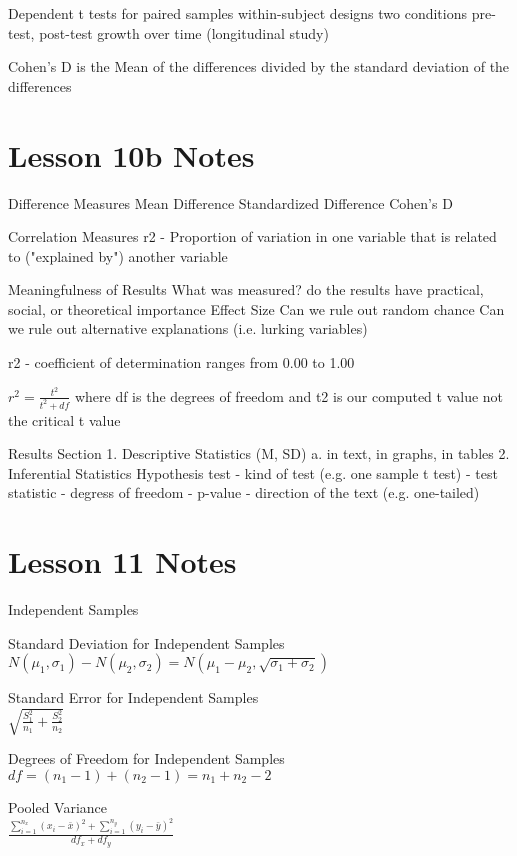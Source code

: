 \documentclass{article}
\begin{document}
Dependent t tests for paired samples
within-subject designs
two conditions
pre-test, post-test
growth over time (longitudinal study)

Cohen's D is the Mean of the differences divided by the standard deviation of the differences

\section{Lesson 10b Notes}

Difference Measures
  Mean Difference
  Standardized Difference
    Cohen's D
    
Correlation Measures
  r2 - Proportion of variation in one variable that is related to ("explained by") another variable
  
Meaningfulness of Results
  What was measured?
    do the results have practical, social, or theoretical importance
  Effect Size
  Can we rule out random chance
  Can we rule out alternative explanations (i.e. lurking variables)
  
r2 - coefficient of determination
ranges from 0.00 to 1.00

\( r^2 = \frac{t^2}{t^2 + df} \) where df is the degrees of freedom and t2 is our computed t value not the critical t value

Results Section
1. Descriptive Statistics (M, SD)
  a. in text, in graphs, in tables
2. Inferential Statistics
  Hypothesis test
    - kind of test  (e.g. one sample t test)
    - test statistic
    - degress of freedom
    - p-value
    - direction of the text (e.g. one-tailed)
    
\section{Lesson 11 Notes}
Independent Samples

Standard Deviation for Independent Samples\\
\( N(\mu_1,\sigma_1) - N(\mu_2,\sigma_2) = N(\mu_1-\mu_2, \sqrt{\sigma_1+\sigma_2}) \)

Standard Error for Independent Samples\\
\( \sqrt{\frac{S_1^2}{n_1} + \frac{S_2^2}{n_2}} \)

Degrees of Freedom for Independent Samples\\
\( df = (n_1-1) + (n_2-1) = n_1+n_2 - 2 \)

Pooled Variance\\
\(\frac{\sum_{i=1}^{n_x} (x_i-\bar{x})^2 + \sum_{i=1}^{n_y} (y_i-\bar{y})^2}{df_x + df_y} \)
\end{document}
